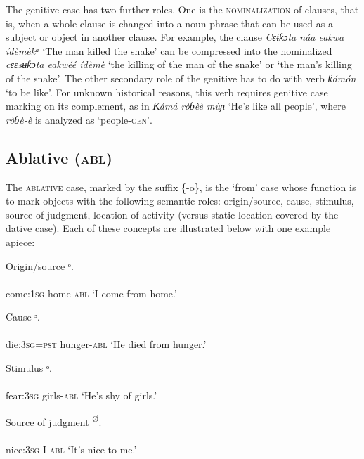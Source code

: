 The genitive case has two further roles. One is the \textsc{nominalization} of clauses, that is, when a whole clause is changed into a noun phrase that can be used as a subject or object in another clause. For example, the clause \textit{Cɛɨƙɔta náa eakwa ídèmèkᵃ} ‘The man killed the snake’ can be compressed into the nominalized \textit{cɛɛsʉƙɔta eakwéé ídèmè} ‘the killing of the man of the snake’ or ‘the man’s killing of the snake’. The other secondary role of the genitive has to do with verb \textit{ƙámón} ‘to be like’. For unknown historical reasons, this verb requires genitive case marking on its complement, as in \textit{Ƙámá ròɓèè mùɲ} ‘He’s like all people’, where \textit{ròɓè-è} is analyzed as ‘people-\textsc{gen’}.





\subsection{Ablative (\textsc{abl})}


The \textsc{ablative} case, marked by the suffix \{-o\}, is the ‘from’ case whose function is to mark objects with the following semantic roles: origin/source, cause, stimulus, source of judgment, location of activity (versus static location covered by the dative case). Each of these concepts are illustrated below with one example apiece:




Origin/source
\ea\label{ex:}
ᵒ. \\
    \\
come:\textsc{1sg}   home-\textsc{abl}
\glt ‘I come from home.’ 
\z




Cause
\ea\label{ex:}
ᵓ. \\
    \\
die:\textsc{3sg}=\textsc{pst}     hunger-\textsc{abl}
\glt ‘He died from hunger.’ 
\z




Stimulus
\ea\label{ex:}
ᵒ. \\
    \\
fear:\textsc{3sg}   girls-\textsc{abl}
\glt ‘He’s shy of girls.’ 
\z




Source of judgment
\ea\label{ex:}
\textsuperscript{Ø}. \\
    \\
nice:\textsc{3sg}   I-\textsc{abl}
\glt ‘It’s nice to me.’ 
\z




